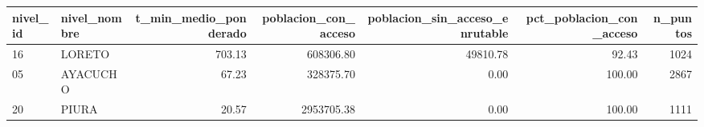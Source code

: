 \begin{tabular}{llrrrrr}
\toprule
nivel_id & nivel_nombre & t_min_medio_ponderado & poblacion_con_acceso & poblacion_sin_acceso_enrutable & pct_poblacion_con_acceso & n_puntos \\
\midrule
16 & LORETO & 703.13 & 608306.80 & 49810.78 & 92.43 & 1024 \\
05 & AYACUCHO & 67.23 & 328375.70 & 0.00 & 100.00 & 2867 \\
20 & PIURA & 20.57 & 2953705.38 & 0.00 & 100.00 & 1111 \\
\bottomrule
\end{tabular}
